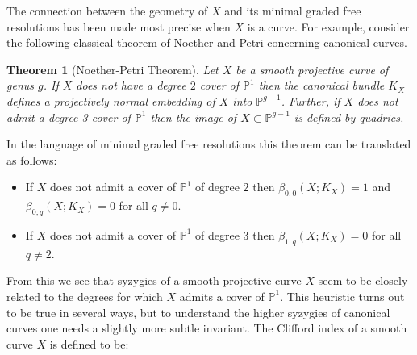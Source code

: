 \documentclass[11pt,reqno]{amsart}
\newtheorem{theorem}[lemma]{Theorem}
\theoremstyle{remark}
\newcommand{\gon}{\operatorname{gon}}
\renewcommand{\P}{\mathbb{P}}
\newcommand{\juliette}[1]{{\color{red} \sf $\spadesuit\spadesuit\spadesuit$ Juliette: [#1]}}
\begin{document}

The connection between the geometry of $X$ and its minimal graded free resolutions has been made most precise when $X$ is a curve. For example, consider the following classical theorem of Noether and Petri concerning canonical curves.

\begin{theorem}[Noether-Petri Theorem]\label{thm:noether-petri}
	Let $X$ be a smooth projective curve of genus $g$. If $X$ does not have a degree $2$ cover of $\P^{1}$ then the canonical bundle $K_{X}$ defines a projectively normal embedding of $X$ into $\P^{g-1}$. Further, if $X$ does not admit a degree 3 cover of $\P^{1}$ then the image of $X\subset \P^{g-1}$ is defined by quadrics. 
\end{theorem}

In the language of minimal graded free resolutions this theorem can be translated as follows: 
\begin{itemize}
\item If $X$ does not admit a cover of $\P^{1}$ of degree $2$ then $\beta_{0,0}(X;K_X)=1$ and $\beta_{0,q}(X;K_X)=0$ for all $q\neq0$. 
\item If $X$ does not admit a cover of $\P^{1}$ of degree $3$ then $\beta_{1,q}(X;K_X)=0$ for all $q\neq2$. 
\end{itemize}
From this we see that syzygies of a smooth projective curve $X$ seem to be closely related to the degrees for which $X$ admits a cover of $\P^{1}$. This heuristic turns out to be true in several ways, but to understand the higher syzygies of canonical curves one needs a slightly more subtle invariant. The Clifford index of a smooth curve $X$ is defined to be: 

%
%

\end{document}
